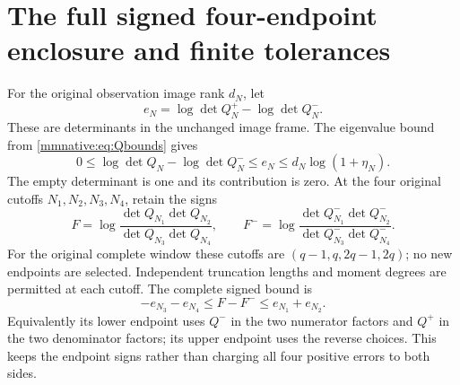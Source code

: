 \documentclass[11pt]{article}
\begin{document}
\section{The full signed four-endpoint enclosure and finite tolerances}

For the original observation image rank $d_N$, let
\begin{equation}\label{mmnative:eq:deterror}
 e_N=\log\det Q_N^+-\log\det Q_N^-.
\end{equation}
These are determinants in the unchanged image frame.  The eigenvalue
bound from \eqref{mmnative:eq:Qbounds} gives
\begin{equation}\label{mmnative:eq:detcap}
 0\le\log\det Q_N-\log\det Q_N^-
 \le e_N\le d_N\log(1+\eta_N).
\end{equation}
The empty determinant is one and its contribution is zero.
At the four original cutoffs $N_1,N_2,N_3,N_4$, retain the signs
\[
 F=\log\frac{\det Q_{N_1}\det Q_{N_2}}
                    {\det Q_{N_3}\det Q_{N_4}},\qquad
 F^-=\log\frac{\det Q_{N_1}^-\det Q_{N_2}^-}
                     {\det Q_{N_3}^-\det Q_{N_4}^-}.
\]
For the original complete window these cutoffs are
$(q-1,q,2q-1,2q)$; no new endpoints are selected.  Independent
truncation lengths and moment degrees are permitted at each cutoff.
The complete signed bound is
\begin{equation}\label{mmnative:eq:four}
 \boxed{-e_{N_3}-e_{N_4}\le F-F^-
                       \le e_{N_1}+e_{N_2}.}
\end{equation}
Equivalently its lower endpoint uses $Q^-$ in the two numerator
factors and $Q^+$ in the two denominator factors; its upper endpoint
uses the reverse choices.  This keeps the endpoint signs rather than
charging all four positive errors to both sides.
\end{document}
